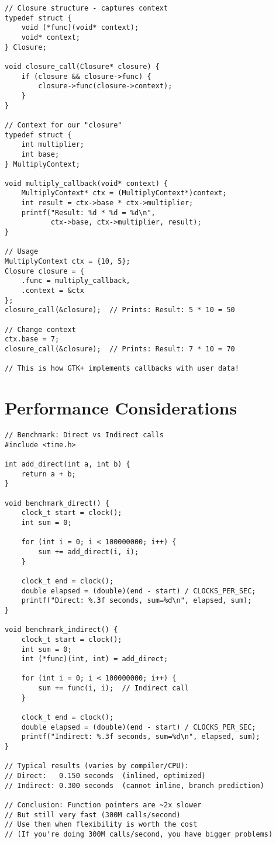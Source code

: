 \begin{lstlisting}
// Closure structure - captures context
typedef struct {
    void (*func)(void* context);
    void* context;
} Closure;

void closure_call(Closure* closure) {
    if (closure && closure->func) {
        closure->func(closure->context);
    }
}

// Context for our "closure"
typedef struct {
    int multiplier;
    int base;
} MultiplyContext;

void multiply_callback(void* context) {
    MultiplyContext* ctx = (MultiplyContext*)context;
    int result = ctx->base * ctx->multiplier;
    printf("Result: %d * %d = %d\n",
           ctx->base, ctx->multiplier, result);
}

// Usage
MultiplyContext ctx = {10, 5};
Closure closure = {
    .func = multiply_callback,
    .context = &ctx
};
closure_call(&closure);  // Prints: Result: 5 * 10 = 50

// Change context
ctx.base = 7;
closure_call(&closure);  // Prints: Result: 7 * 10 = 70

// This is how GTK+ implements callbacks with user data!
\end{lstlisting}

\section{Performance Considerations}

\begin{lstlisting}
// Benchmark: Direct vs Indirect calls
#include <time.h>

int add_direct(int a, int b) {
    return a + b;
}

void benchmark_direct() {
    clock_t start = clock();
    int sum = 0;

    for (int i = 0; i < 100000000; i++) {
        sum += add_direct(i, i);
    }

    clock_t end = clock();
    double elapsed = (double)(end - start) / CLOCKS_PER_SEC;
    printf("Direct: %.3f seconds, sum=%d\n", elapsed, sum);
}

void benchmark_indirect() {
    clock_t start = clock();
    int sum = 0;
    int (*func)(int, int) = add_direct;

    for (int i = 0; i < 100000000; i++) {
        sum += func(i, i);  // Indirect call
    }

    clock_t end = clock();
    double elapsed = (double)(end - start) / CLOCKS_PER_SEC;
    printf("Indirect: %.3f seconds, sum=%d\n", elapsed, sum);
}

// Typical results (varies by compiler/CPU):
// Direct:   0.150 seconds  (inlined, optimized)
// Indirect: 0.300 seconds  (cannot inline, branch prediction)

// Conclusion: Function pointers are ~2x slower
// But still very fast (300M calls/second)
// Use them when flexibility is worth the cost
// (If you're doing 300M calls/second, you have bigger problems)
\end{lstlisting}

